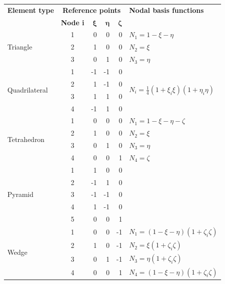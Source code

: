 \documentclass[a4paper,10pt]{article}
\begin{document}
\begin{table}[htb]
\centering
\begin{tabular}{lcrrrl}
  \textbf{Element type} & \multicolumn{4}{c}{\textbf{Reference points}} &
  \textbf{Nodal basis functions}\\ & \textbf{Node i} & $\boldsymbol{\xi}$ &
  $\boldsymbol{\eta}$ & $\boldsymbol{\zeta}$ &\\ \hline\hline
  \multirow{3}{14mm}{Triangle} & 1 & 0 & 0 & 0 & $N_1 = 1 - \xi - \eta$\\
                               & 2 & 1 & 0 & 0 & $N_2 =\xi$\\
                               & 3 & 0 & 1 & 0 & $N_3 = \eta$\\
  \hline
  \multirow{4}{14mm}{Quadrilateral} & 1 & -1 & -1 & 0 & \multirow{4}{40mm}{$N_i = \frac{1}{4}(1 + \xi_i\xi)(1 + \eta_i\eta)$}\\
                                    & 2 &  1 & -1 & 0 & \\
                                    & 3 &  1 &  1 & 0 & \\
                                    & 4 & -1 &  1 & 0 & \\
  \hline
  \multirow{4}{14mm}{Tetrahedron} & 1 & 0 & 0 & 0 & $N_1 = 1 - \xi - \eta -\zeta$\\
                                  & 2 & 1 & 0 & 0 & $N_2 =\xi$\\
                                  & 3 & 0 & 1 & 0 & $N_3 =\eta$\\
                                  & 4 & 0 & 0 & 1 & $N_4 =\zeta$\\
  \hline
  \multirow{5}{14mm}{Pyramid} & 1 &  1 &  0 & 0 & \\
                              & 2 & -1 &  1 & 0 & \\
                              & 3 & -1 & -1 & 0 & \\
                              & 4 &  1 & -1 & 0 & \\
                              & 5 &  0 &  0 & 1 & \\
  \hline
  \multirow{6}{14mm}{Wedge} & 1 & 0 & 0 & -1 & $N_1 = (1 - \xi - \eta)(1 + \zeta_i\zeta)$\\
                            & 2 & 1 & 0 & -1 & $N_2 = \xi(1 + \zeta_i\zeta)$\\
                            & 3 & 0 & 1 & -1 & $N_3 = \eta(1 + \zeta_i\zeta)$\\
                            & 4 & 0 & 0 &  1 & $N_4 = (1 - \xi - \eta)(1 + \zeta_i\zeta)$\\

\end{tabular}
\end{table}
\end{document}
